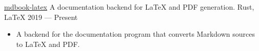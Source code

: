 \showoff
{\textcolor{my-blue}{\href{https://github.com/lbeckman314/mdbook-latex}{mdbook-latex}}}
{A documentation backend for \LaTeX{} and PDF generation.}
{Rust, \LaTeX{}}
{2019 --- Present}

\begin{itemize}[label=$\triangleright$]
    \item A backend for the  documentation program that converts Markdown sources to \LaTeX{} and PDF.
\end{itemize}


